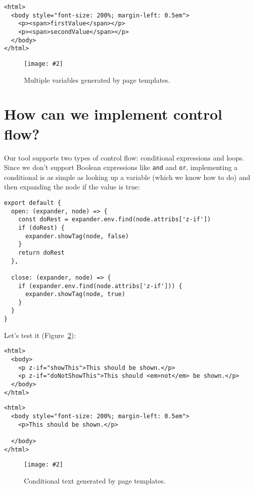 \documentclass[krantzl]{krantz}
\newcommand{\figpdf}[4]{\begin{figure}%
\centering%
\texttt{[image: \#2]}%
\caption{#3}%
\label{#1}%
\end{figure}}
\newcommand{\figref}[1]{Figure~\ref{#1}}
\begin{document}
\begin{lstlisting}[frame=single,frameround=tttt]
<html>
  <body style="font-size: 200%; margin-left: 0.5em">
    <p><span>firstValue</span></p>
    <p><span>secondValue</span></p>
  </body>
</html>
\end{lstlisting}


\figpdf{page-templates-output-multiple-variables}{./page-templates/output-multiple-variables.pdf}{Multiple variables generated by page templates.}{0.6}

\section{How can we implement control flow?}\label{page-templates-flow}


Our tool supports two types of control flow:
conditional expressions and loops.
Since we don't support Boolean expressions like \texttt{and} and \texttt{or},
implementing a conditional is as simple as looking up a variable
(which we know how to do)
and then expanding the node if the value is true:


\begin{lstlisting}[frame=single,frameround=tttt]
export default {
  open: (expander, node) => {
    const doRest = expander.env.find(node.attribs['z-if'])
    if (doRest) {
      expander.showTag(node, false)
    }
    return doRest
  },

  close: (expander, node) => {
    if (expander.env.find(node.attribs['z-if'])) {
      expander.showTag(node, true)
    }
  }
}
\end{lstlisting}



Let's test it (\figref{page-templates-output-conditional}):


\begin{lstlisting}[frame=single,frameround=tttt]
<html>
  <body>
    <p z-if="showThis">This should be shown.</p>
    <p z-if="doNotShowThis">This should <em>not</em> be shown.</p>
  </body>
</html>
\end{lstlisting}



\begin{lstlisting}[frame=single,frameround=tttt]
<html>
  <body style="font-size: 200%; margin-left: 0.5em">
    <p>This should be shown.</p>

  </body>
</html>
\end{lstlisting}


\figpdf{page-templates-output-conditional}{./page-templates/output-conditional.pdf}{Conditional text generated by page templates.}{0.6}
\end{document}
